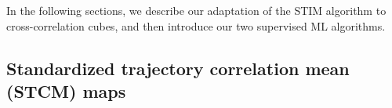 \documentclass{aa}
\begin{document}
In the following sections, we describe our adaptation of the STIM algorithm to cross-correlation cubes, and then introduce our two supervised ML algorithms.

\subsection{Standardized trajectory correlation mean (STCM) maps}
\end{document}
